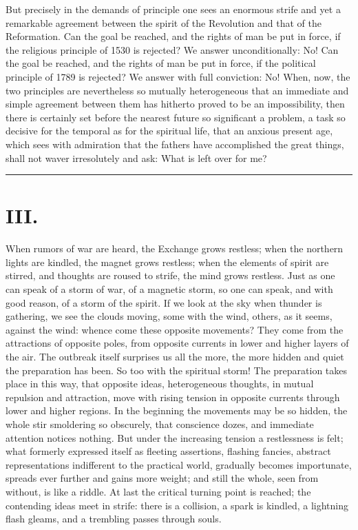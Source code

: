 \documentclass[12pt]{book}
\newcommand{\opage}[1]{\marginnote{\footnotesize\textit{[#1]}}}
\begin{document}
But precisely in the demands of principle one sees an enormous strife
and yet a remarkable agreement between the spirit of the Revolution and
that of the Reformation. Can the goal be reached, and the rights of man
be put in force, if the religious principle of 1530 is rejected? We
answer unconditionally: No! Can the goal be reached, and the rights of
man be put in force, if the political principle of 1789 is rejected? We
answer with full conviction: No! When, now, the two principles are
nevertheless so mutually heterogeneous that an immediate and simple
agreement between them has hitherto proved to be an impossibility, then
there is certainly set before the nearest future so significant a
problem, a task so decisive for the temporal as for the spiritual life,
that an anxious present age, which sees with admiration that the fathers
have accomplished the great things, shall not waver irresolutely and
ask: What is left over for me?

\begin{center}\rule{3cm}{0.4pt}\end{center}

\chapter*{III.}
\label{ch:iii}
\opage{36}\setcounter{footnote}{0}%
When rumors of war are heard, the Exchange grows restless; when the
northern lights are kindled, the magnet grows restless; when the elements
of spirit are stirred, and thoughts are roused to strife, the mind grows
restless. Just as one can speak of a storm of war, of a magnetic storm,
so one can speak, and with good reason, of a storm of the spirit. If we
look at the sky when thunder is gathering, we see the clouds moving,
some with the wind, others, as it seems, against the wind: whence come
these opposite movements? They come from the attractions of opposite
poles, from opposite currents in lower and higher layers of the air. The
outbreak itself surprises us all the more, the more hidden and quiet the
preparation has been. So too with the spiritual storm! The preparation
takes place in this way, that opposite ideas, heterogeneous thoughts, in
mutual repulsion and attraction, move with rising tension in opposite
currents through lower and higher regions. In the beginning the
movements may be so hidden, the whole stir smoldering so obscurely, that
conscience dozes, and immediate attention notices nothing. But under the
increasing tension a restlessness is felt; what formerly expressed
itself as fleeting assertions, flashing fancies, abstract representations
indifferent to the practical
\opage{37}\setcounter{footnote}{0}%
world, gradually becomes importunate, spreads ever further and gains
more weight; and still the whole, seen from without, is like a riddle.
At last the critical turning point is reached; the contending ideas meet
in strife: there is a collision, a spark is kindled, a lightning flash
gleams, and a trembling passes through souls.
\end{document}
